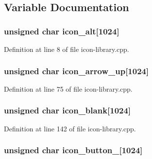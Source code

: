 \subsection{Variable Documentation}
\hypertarget{icon-library_8cpp_a3d87e2c334c64f98986d500164b20c73}{
\subsubsection[{icon\_\-alt}]{\setlength{\rightskip}{0pt plus 5cm}unsigned char {\bf icon\_\-alt}\mbox{[}1024\mbox{]}}}
\label{icon-library_8cpp_a3d87e2c334c64f98986d500164b20c73}


Definition at line 8 of file icon-\/library.cpp.

\hypertarget{icon-library_8cpp_aa3885d09f33af4fd500f9a5dacc85a1d}{
\subsubsection[{icon\_\-arrow\_\-up}]{\setlength{\rightskip}{0pt plus 5cm}unsigned char {\bf icon\_\-arrow\_\-up}\mbox{[}1024\mbox{]}}}
\label{icon-library_8cpp_aa3885d09f33af4fd500f9a5dacc85a1d}


Definition at line 75 of file icon-\/library.cpp.

\hypertarget{icon-library_8cpp_a398482e126ce2b5920cfcee78bbeab3b}{
\subsubsection[{icon\_\-blank}]{\setlength{\rightskip}{0pt plus 5cm}unsigned char {\bf icon\_\-blank}\mbox{[}1024\mbox{]}}}
\label{icon-library_8cpp_a398482e126ce2b5920cfcee78bbeab3b}


Definition at line 142 of file icon-\/library.cpp.

\hypertarget{icon-library_8cpp_a7d25b19d15719c47d6ddac1c16bb3816}{
\subsubsection[{icon\_\-button\_\-1}]{\setlength{\rightskip}{0pt plus 5cm}unsigned char {\bf icon\_\-button\_}\mbox{[}1024\mbox{]}}}
\label{icon-library_8cpp_a7d25b19d15719c47d6ddac1c16bb3816}


